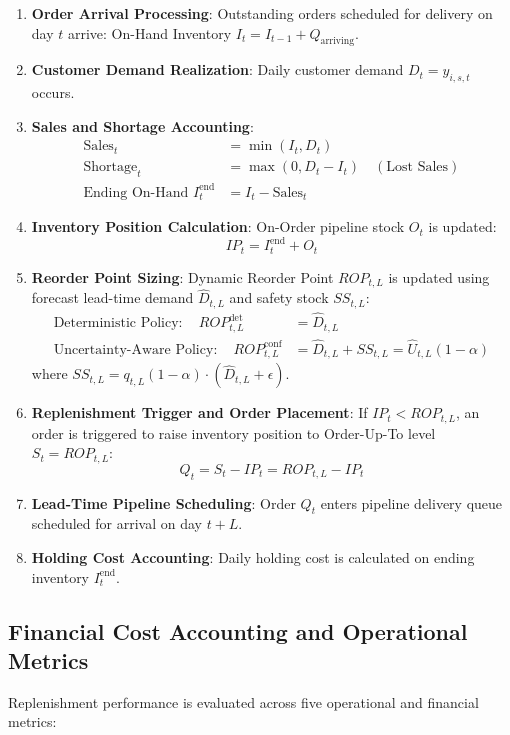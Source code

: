 \begin{enumerate}
    \item \textbf{Order Arrival Processing}: Outstanding orders scheduled for delivery on day $t$ arrive: On-Hand Inventory $I_t = I_{t-1} + Q_{\text{arriving}}$.
    \item \textbf{Customer Demand Realization}: Daily customer demand $D_t = y_{i,s,t}$ occurs.
    \item \textbf{Sales and Shortage Accounting}: 
    \begin{align}
    \text{Sales}_t &= \min(I_t, D_t) \\
    \text{Shortage}_t &= \max(0, D_t - I_t) \quad (\text{Lost Sales}) \\
    \text{Ending On-Hand } I_t^{\text{end}} &= I_t - \text{Sales}_t
    \end{align}
    \item \textbf{Inventory Position Calculation}: On-Order pipeline stock $O_t$ is updated:
    \begin{equation}
    IP_t = I_t^{\text{end}} + O_t
    \end{equation}
    \item \textbf{Reorder Point Sizing}: Dynamic Reorder Point $ROP_{t,L}$ is updated using forecast lead-time demand $\hat{D}_{t,L}$ and safety stock $SS_{t,L}$:
    \begin{align}
    \text{Deterministic Policy}: \quad ROP_{t,L}^{\text{det}} &= \hat{D}_{t,L} \\
    \text{Uncertainty-Aware Policy}: \quad ROP_{t,L}^{\text{conf}} &= \hat{D}_{t,L} + SS_{t,L} = \hat{U}_{t,L}(1-\alpha)
    \end{align}
    where $SS_{t,L} = q_{t,L}(1-\alpha) \cdot (\hat{D}_{t,L} + \epsilon)$.
    \item \textbf{Replenishment Trigger and Order Placement}: If $IP_t < ROP_{t,L}$, an order is triggered to raise inventory position to Order-Up-To level $S_t = ROP_{t,L}$:
    \begin{equation}
    Q_t = S_t - IP_t = ROP_{t,L} - IP_t
    \end{equation}
    \item \textbf{Lead-Time Pipeline Scheduling}: Order $Q_t$ enters pipeline delivery queue scheduled for arrival on day $t + L$.
    \item \textbf{Holding Cost Accounting}: Daily holding cost is calculated on ending inventory $I_t^{\text{end}}$.
\end{enumerate}

\subsection{Financial Cost Accounting and Operational Metrics}
Replenishment performance is evaluated across five operational and financial metrics:


